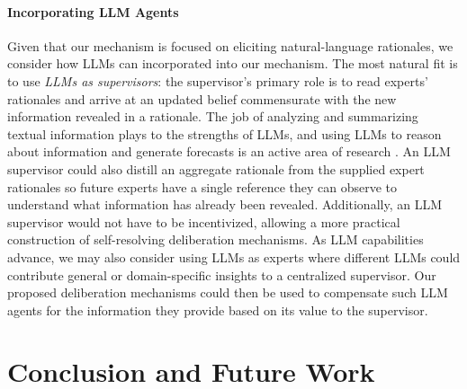\documentclass{winnower}
\begin{document}
\paragraph{Incorporating LLM Agents} Given that our mechanism is focused on eliciting natural-language rationales, we consider how LLMs can incorporated into our mechanism. The most natural fit is to use \emph{LLMs as supervisors}: the supervisor's primary role is to read experts' rationales and arrive at an updated belief commensurate with the new information revealed in a rationale. The job of analyzing and summarizing textual information plays to the strengths of LLMs, and using LLMs to reason about information and generate forecasts is an active area of research \citep{halawi2024approaching, schoenegger2024wisdom, karger2024forecastbench}. An LLM supervisor could also distill an aggregate rationale from the supplied expert rationales so future experts have a single reference they can observe to  understand what information has already been revealed. Additionally, an LLM supervisor would not have to be incentivized, allowing a more practical construction of self-resolving deliberation mechanisms. As LLM capabilities advance, we may also consider using LLMs as experts where different LLMs could contribute general or domain-specific insights to a centralized supervisor. Our proposed deliberation mechanisms could then be used to compensate such LLM agents for the information they provide based on its value to the supervisor. 

\section{Conclusion and Future Work}
\end{document}
